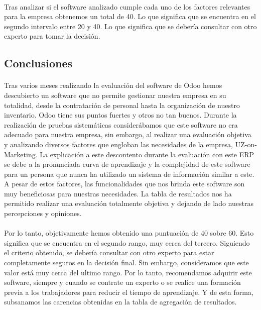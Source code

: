 \paragraph{}
Tras analizar si el software analizado cumple cada uno de los factores relevantes para la empresa obtenemos un total de 40. Lo que significa que se encuentra en el segundo intervalo entre 20 y 40. Lo que significa que se debería consultar con otro experto para tomar la decisión. 
\subsection{Conclusiones}
\paragraph{}
Tras varios meses realizando la evaluación del software de Odoo hemos descubierto un software que no permite gestionar nuestra empresa en su totalidad, desde la contratación de personal hasta la organización de nuestro inventario. Odoo tiene sus puntos fuertes y otros no tan buenos. Durante la realización de pruebas sistemáticas considerábamos que este software no era adecuado para nuestra empresa, sin embargo, al realizar una evaluación objetiva y analizando diversos factores que engloban las necesidades de la empresa, UZ-on-Marketing. La explicación a este descontento durante la evaluación con este ERP se debe a la pronunciada curva de aprendizaje y la complejidad de este software para un persona que nunca ha utilizado un sistema de información similar a este. A pesar de estos factores, las funcionalidades que nos brinda este software son muy beneficiosas para nuestras necesidades. La tabla de resultados nos ha permitido realizar una evaluación totalmente objetiva y dejando de lado nuestras percepciones y opiniones.

\paragraph{}
Por lo tanto, objetivamente hemos obtenido una puntuación de 40 sobre 60. Esto significa que se encuentra en el segundo rango, muy cerca del tercero. Siguiendo el criterio obtenido, se debería consultar con otro experto para estar completamente seguros en la decisión final. Sin embargo, consideramos que este valor está muy cerca del ultimo rango. Por lo tanto, recomendamos adquirir este software, siempre y cuando se contrate un experto o se realice una formación previa a los trabajadores para reducir el tiempo de aprendizaje. Y de esta forma, subsanamos las carencias obtenidas en la tabla de agregación de resultados.